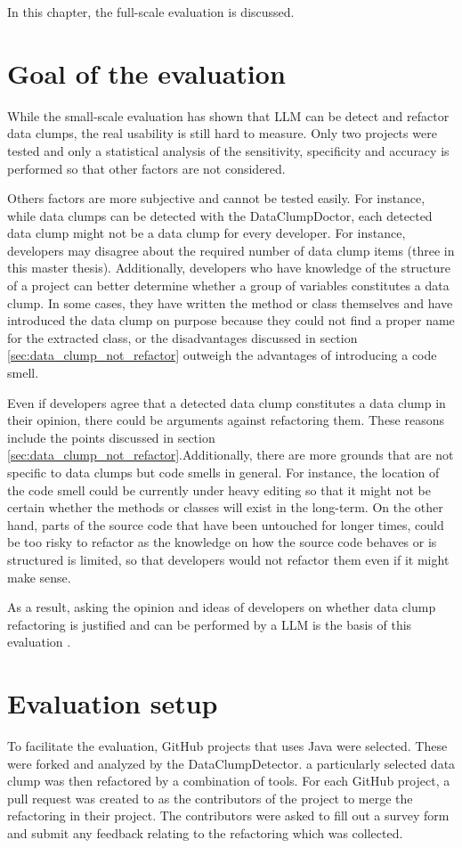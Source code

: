 
In this chapter, the full-scale evaluation is discussed.
\section{Goal of the evaluation}
While the small-scale evaluation has shown that \acs{LLM} can be detect and refactor data clumps, the real usability is still hard to measure. Only two projects were tested and only a statistical analysis of the sensitivity, specificity and accuracy  is performed so that other factors are not considered.

Others factors are more subjective and cannot be tested  easily.  For instance, while data clumps can be detected with the DataClumpDoctor, each detected data clump might not be a data clump for every developer. For instance, developers may disagree about the required number of data clump items (three in this master thesis). Additionally, developers who have knowledge of the structure of a project can better determine whether a group of variables  constitutes a data clump. In some cases, they have written the method or class themselves and have introduced the data clump on purpose because they could not find a proper name for the extracted class, or the disadvantages discussed in section \ref{sec:data_clump_not_refactor} outweigh the advantages of introducing a code smell. 

Even if developers agree that a detected data clump constitutes a data clump  in their opinion, there could be arguments against refactoring them. These reasons include the points  discussed in section \ref{sec:data_clump_not_refactor}.Additionally, there are more grounds that are not specific to data clumps but code smells in general. For instance, the location of the code smell could be currently under heavy editing so that it might not be certain whether the methods or classes will exist in the long-term. On the other hand, parts of the source code that have been untouched for longer times, could be too risky to refactor as the knowledge on how the source code behaves or is structured is limited, so that developers would not refactor them even if it might make sense. 

As a result, asking the opinion and ideas of developers on whether data clump refactoring is justified and can be performed by a \ac{LLM} is the basis of this evaluation .
\section{Evaluation setup}
To facilitate the evaluation, GitHub projects that uses Java  were selected. These were forked and analyzed by the DataClumpDetector. a particularly selected data clump was then refactored by a combination of tools. For each GitHub project, a pull request was created to as the contributors  of the project to merge the refactoring in their project. The contributors were asked to fill out a survey form and submit any feedback relating to the refactoring which was collected. 


